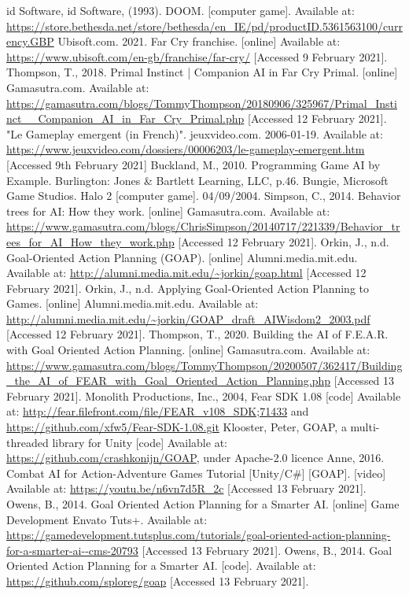\documentclass[10pt]{report}
\begin{document}
\begin{thebibliography}{}
    id Software, id Software, (1993). DOOM. [computer game]. Available at: \url{https://store.bethesda.net/store/bethesda/en_IE/pd/productID.5361563100/currency.GBP}
    Ubisoft.com. 2021. Far Cry franchise. [online] Available at: \url{https://www.ubisoft.com/en-gb/franchise/far-cry/} [Accessed 9 February 2021].
    Thompson, T., 2018. Primal Instinct | Companion AI in Far Cry Primal. [online] Gamasutra.com. Available at: \url{https://gamasutra.com/blogs/TommyThompson/20180906/325967/Primal_Instinct__Companion_AI_in_Far_Cry_Primal.php} [Accessed 12 February 2021].
    "Le Gameplay emergent (in French)". jeuxvideo.com. 2006-01-19. Available at: \url{https://www.jeuxvideo.com/dossiers/00006203/le-gameplay-emergent.htm} [Accessed 9th February 2021]
    Buckland, M., 2010. Programming Game AI by Example. Burlington: Jones \& Bartlett Learning, LLC, p.46.
    Bungie, Microsoft Game Studios. Halo 2 [computer game]. 04/09/2004.
    Simpson, C., 2014. Behavior trees for AI: How they work. [online] Gamasutra.com. Available at: \url{https://www.gamasutra.com/blogs/ChrisSimpson/20140717/221339/Behavior_trees_for_AI_How_they_work.php} [Accessed 12 February 2021].
    Orkin, J., n.d. Goal-Oriented Action Planning (GOAP). [online] Alumni.media.mit.edu. Available at: \url{http://alumni.media.mit.edu/~jorkin/goap.html} [Accessed 12 February 2021].
    Orkin, J., n.d. Applying Goal-Oriented Action Planning to Games. [online] Alumni.media.mit.edu. Available at: \url{http://alumni.media.mit.edu/~jorkin/GOAP_draft_AIWisdom2_2003.pdf} [Accessed 12 February 2021].
    Thompson, T., 2020. Building the AI of F.E.A.R. with Goal Oriented Action Planning. [online] Gamasutra.com. Available at: \url{https://www.gamasutra.com/blogs/TommyThompson/20200507/362417/Building_the_AI_of_FEAR_with_Goal_Oriented_Action_Planning.php} [Accessed 13 February 2021].
    Monolith Productions, Inc., 2004, Fear SDK 1.08 [code] Available at: \url{http://fear.filefront.com/file/FEAR_v108_SDK;71433} and \url{https://github.com/xfw5/Fear-SDK-1.08.git}
    Klooster, Peter, GOAP, a multi-threaded library for Unity [code] Available at: \url{https://github.com/crashkonijn/GOAP}, under Apache-2.0 licence
    Anne, 2016. Combat AI for Action-Adventure Games Tutorial [Unity/C\#] [GOAP]. [video] Available at: \url{https://youtu.be/n6vn7d5R_2c} [Accessed 13 February 2021].
    Owens, B., 2014. Goal Oriented Action Planning for a Smarter AI. [online] Game Development Envato Tuts+. Available at: \url{https://gamedevelopment.tutsplus.com/tutorials/goal-oriented-action-planning-for-a-smarter-ai--cms-20793} [Accessed 13 February 2021].
    Owens, B., 2014. Goal Oriented Action Planning for a Smarter AI. [code]. Available at: \url{https://github.com/sploreg/goap} [Accessed 13 February 2021].


\end{thebibliography}
\end{document}
